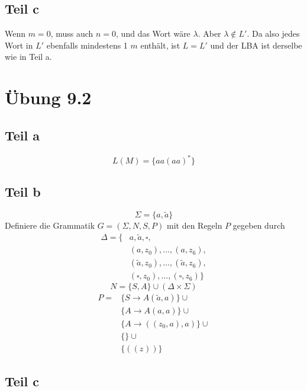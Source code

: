 \documentclass[10pt,a4paper]{article}
\begin{document}
\subsection{Teil c}

Wenn $m = 0$, muss auch $n = 0$, und das Wort wäre $\lambda$.
Aber $\lambda \not\in L'$.
Da also jedes Wort in $L'$ ebenfalls mindestens 1 $m$ enthält, ist $L = L'$ und der LBA ist derselbe wie in Teil a.

\section{Übung 9.2}

\subsection{Teil a}

\begin{equation}
  L(M) = \{ aa(aa)^{*} \}
\end{equation}

\subsection{Teil b}

\begin{equation}
  \Sigma = \{ a, \tilde{a} \}
\end{equation}
Definiere die Grammatik $G = (\Sigma, N, S, P)$ mit den Regeln $P$ gegeben durch
\begin{align*}
  \Delta = \{ & a, \tilde{a}, \square,\\
  & (a, z_{0}), \dots, (a, z_{6}),\\
  & (\tilde{a}, z_{0}), \dots, (\tilde{a}, z_{6}),\\
  & (\square, z_{0}), \dots, (\square, z_{6}) \}
\end{align*}
\begin{equation}
  N = \{ S, A \} \cup (\Delta \times \Sigma)
\end{equation}
\begin{align*}
  P = & \{ S \rightarrow A(\tilde{a}, a) \} \cup\\
  & \{ A \rightarrow A(a, a) \} \cup\\
  & \{ A \rightarrow ((z_{0}, a), a) \} \cup\\
  & \{  \} \cup\\
  & \{ ((z_{})) \}
\end{align*}

\subsection{Teil c}
\end{document}
